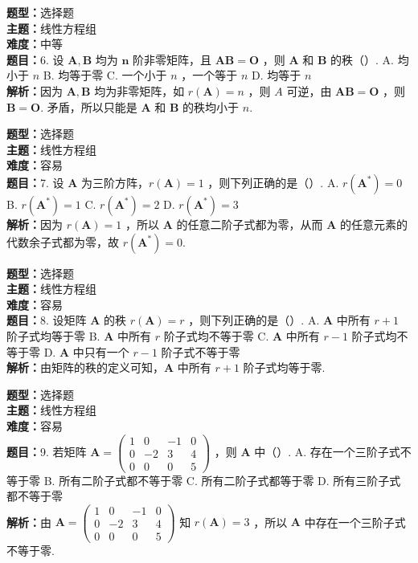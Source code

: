 \documentclass{ctexart}
\newenvironment{question}[5]{%
	\noindent\textbf{题型：}#1\\
	\textbf{主题：}#2\\
	\textbf{难度：}#3\\
	\textbf{题目：}#4\\
	\textbf{解析：}#5\\
	\vspace{1em}
}{}
\begin{document}
	\begin{question}
		{选择题}
		{线性方程组}
		{中等}
		{6. 设 \(\mathbf{A}, \mathbf{B}\) 均为 \(\boldsymbol{n}\) 阶非零矩阵，且 \(\mathbf{A B}=\mathbf{O}\) ，则 \(\mathbf{A}\) 和 \(\mathbf{B}\) 的秩（）. 
			A. 均小于 \(n\)
			B. 均等于零
			C. 一个小于 \(n\) ，一个等于 \(n\)
			D. 均等于 \(n\)}
		{因为 \(\mathbf{A}, \mathbf{B}\) 均为非零矩阵，如 \(r(\mathbf{A})=n\) ，则 \(A\) 可逆，由 \(\mathbf{A B}=\mathbf{O}\) ，则 \(\mathbf{B}=\mathbf{O}\). 矛盾，所以只能是 \(\mathbf{A}\) 和 \(\mathbf{B}\) 的秩均小于 \(n\). }
	\end{question}
	
	\begin{question}
		{选择题}
		{线性方程组}
		{容易}
		{7. 设 \(\mathbf{A}\) 为三阶方阵，\(r(\mathbf{A})=1\) ，则下列正确的是（）. 
			A. \(r\left(\mathbf{A}^*\right)=0\)
			B. \(r\left(\mathbf{A}^*\right)=1\)
			C. \(r\left(\mathbf{A}^*\right)=2\)
			D. \(r\left(\mathbf{A}^*\right)=3\)}
		{因为 \(r(\mathbf{A})=1\) ，所以 \(\mathbf{A}\) 的任意二阶子式都为零，从而 \(\mathbf{A}\) 的任意元素的代数余子式都为零，故 \(r\left(\mathbf{A}^*\right)=0\). }
	\end{question}
	
	\begin{question}
		{选择题}
		{线性方程组}
		{容易}
		{8. 设矩阵 \(\mathbf{A}\) 的秩 \(r(\mathbf{A})=r\) ，则下列正确的是（）. 
			A. \(\mathbf{A}\) 中所有 \(r+1\) 阶子式均等于零
			B. \(\mathbf{A}\) 中所有 \(r\) 阶子式均不等于零
			C. \(\mathbf{A}\) 中所有 \(r-1\) 阶子式均不等于零
			D. \(\mathbf{A}\) 中只有一个 \(r-1\) 阶子式不等于零}
		{由矩阵的秩的定义可知，\(\mathbf{A}\) 中所有 \(r+1\) 阶子式均等于零. }
	\end{question}
	
	\begin{question}
		{选择题}
		{线性方程组}
		{容易}
		{9. 若矩阵 \(\mathbf{A}=\left(\begin{array}{cccc}1 & 0 & -1 & 0 \\ 0 & -2 & 3 & 4 \\ 0 & 0 & 0 & 5\end{array}\right)\) ，则 \(\mathbf{A}\) 中（）. 
			A. 存在一个三阶子式不等于零
			B. 所有二阶子式都不等于零
			C. 所有二阶子式都等于零
			D. 所有三阶子式都不等于零}
		{由 \(\mathbf{A}=\left(\begin{array}{cccc}1 & 0 & -1 & 0 \\ 0 & -2 & 3 & 4 \\ 0 & 0 & 0 & 5\end{array}\right)\) 知 \(r(\mathbf{A})=3\) ，所以 \(\mathbf{A}\) 中存在一个三阶子式不等于零. }
	\end{question}
	
\end{document}
